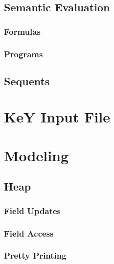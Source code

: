\documentclass[a4paper, 11pt, accentcolor = tud3b]{tudreport}
\begin{document}
			\subsection{Semantic Evaluation} %

				\subsubsection{Formulas} %

				\subsubsection{Programs} %

			\subsection{Sequents} %

		\section{KeY Input File} %

		\section{Modeling} %

			\subsection{Heap} %

				\subsubsection{Field Updates} %

				\subsubsection{Field Access} %

				\subsubsection{Pretty Printing} %
\end{document}
